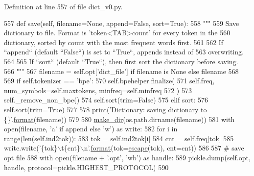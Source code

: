 Definition at line 557 of file dict\+\_\+v0.\+py.


\begin{DoxyCode}
557     \textcolor{keyword}{def }save(self, filename=None, append=False, sort=True):
558         \textcolor{stringliteral}{"""}
559 \textcolor{stringliteral}{        Save dictionary to file. Format is 'token<TAB>count' for every token in the}
560 \textcolor{stringliteral}{        dictionary, sorted by count with the most frequent words first.}
561 \textcolor{stringliteral}{}
562 \textcolor{stringliteral}{        If ``append`` (default ``False``) is set to ``True``, appends instead of}
563 \textcolor{stringliteral}{        overwriting.}
564 \textcolor{stringliteral}{}
565 \textcolor{stringliteral}{        If ``sort`` (default ``True``), then first sort the dictionary before saving.}
566 \textcolor{stringliteral}{        """}
567         filename = self.opt[\textcolor{stringliteral}{'dict\_file'}] \textcolor{keywordflow}{if} filename \textcolor{keywordflow}{is} \textcolor{keywordtype}{None} \textcolor{keywordflow}{else} filename
568 
569         \textcolor{keywordflow}{if} self.tokenizer == \textcolor{stringliteral}{'bpe'}:
570             self.bpehelper.finalize(
571                 self.freq, num\_symbols=self.maxtokens, minfreq=self.minfreq
572             )
573             self.\_remove\_non\_bpe()
574             self.sort(trim=\textcolor{keyword}{False})
575         \textcolor{keywordflow}{elif} sort:
576             self.sort(trim=\textcolor{keyword}{True})
577 
578         print(\textcolor{stringliteral}{'Dictionary: saving dictionary to \{\}'}.\hyperlink{namespaceparlai_1_1chat__service_1_1services_1_1messenger_1_1shared__utils_a32e2e2022b824fbaf80c747160b52a76}{format}(filename))
579 
580         \hyperlink{namespaceparlai_1_1core_1_1build__data_a6ce042fedd4194bd016845bbe7a8facf}{make\_dir}(os.path.dirname(filename))
581         with open(filename, \textcolor{stringliteral}{'a'} \textcolor{keywordflow}{if} append \textcolor{keywordflow}{else} \textcolor{stringliteral}{'w'}) \textcolor{keyword}{as} write:
582             \textcolor{keywordflow}{for} i \textcolor{keywordflow}{in} range(len(self.ind2tok)):
583                 tok = self.ind2tok[i]
584                 cnt = self.freq[tok]
585                 write.write(\textcolor{stringliteral}{'\{tok\}\(\backslash\)t\{cnt\}\(\backslash\)n'}.\hyperlink{namespaceparlai_1_1chat__service_1_1services_1_1messenger_1_1shared__utils_a32e2e2022b824fbaf80c747160b52a76}{format}(tok=\hyperlink{namespaceparlai_1_1agents_1_1legacy__agents_1_1seq2seq_1_1dict__v0_a50d891f5daa90cde2858723889ab0cc8}{escape}(tok), cnt=cnt))
586 
587         \textcolor{comment}{# save opt file}
588         with open(filename + \textcolor{stringliteral}{'.opt'}, \textcolor{stringliteral}{'wb'}) \textcolor{keyword}{as} handle:
589             pickle.dump(self.opt, handle, protocol=pickle.HIGHEST\_PROTOCOL)
590 
\end{DoxyCode}
